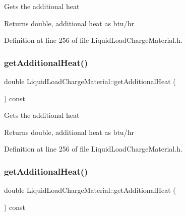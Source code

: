 Gets the additional heat \begin{DoxyReturn}{Returns}
double, additional heat as btu/hr 
\end{DoxyReturn}


Definition at line 256 of file Liquid\+Load\+Charge\+Material.\+h.

\mbox{\label{class_liquid_load_charge_material_a6b79cd1aec59a7f7119a8abfa9e5859b}} 
\subsubsection{\texorpdfstring{get\+Additional\+Heat()}{getAdditionalHeat()}\hspace{0.1cm}{\footnotesize\ttfamily [2/3]}}
{\footnotesize\ttfamily double Liquid\+Load\+Charge\+Material\+::get\+Additional\+Heat (\begin{DoxyParamCaption}{ }\end{DoxyParamCaption}) const\hspace{0.3cm}{\ttfamily [inline]}}

Gets the additional heat \begin{DoxyReturn}{Returns}
double, additional heat as btu/hr 
\end{DoxyReturn}


Definition at line 256 of file Liquid\+Load\+Charge\+Material.\+h.

\mbox{\label{class_liquid_load_charge_material_a6b79cd1aec59a7f7119a8abfa9e5859b}} 
\subsubsection{\texorpdfstring{get\+Additional\+Heat()}{getAdditionalHeat()}\hspace{0.1cm}{\footnotesize\ttfamily [3/3]}}
{\footnotesize\ttfamily double Liquid\+Load\+Charge\+Material\+::get\+Additional\+Heat (\begin{DoxyParamCaption}{ }\end{DoxyParamCaption}) const\hspace{0.3cm}{\ttfamily [inline]}}

